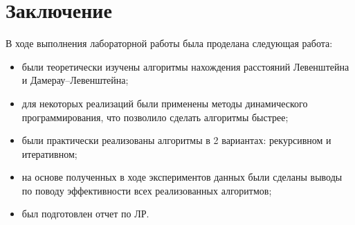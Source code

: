 \chapter*{Заключение}

В ходе выполнения лабораторной работы была проделана следующая работа:

\begin{itemize}
    \item были теоретически изучены алгоритмы нахождения расстояний Левенштейна и Дамерау--Левенштейна;
	\item для некоторых реализаций были применены методы динамического программирования, что позволило сделать алгоритмы быстрее;
	\item были практически реализованы алгоритмы в 2 вариантах: рекурсивном и итеративном;
	\item на основе полученных в ходе экспериментов данных были сделаны выводы по поводу эффективности всех реализованных алгоритмов;
	\item был подготовлен отчет по ЛР.
\end{itemize}

